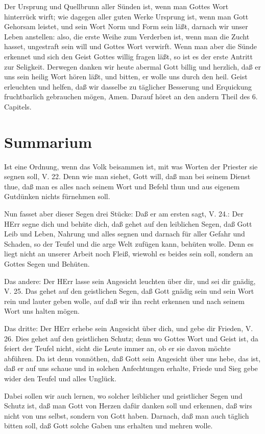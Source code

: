 Der Ursprung und Quellbrunn aller Sünden ist, wenn man Gottes Wort hinterrück wirft; wie dagegen aller guten Werke Ursprung ist, wenn man Gott Gehorsam leistet, und sein Wort Norm und Form sein läßt, darnach wir unser Leben anstellen: also, die erste Weihe zum Verderben ist, wenn man die Zucht hasset, ungestraft sein will und Gottes Wort verwirft. Wenn man aber die Sünde erkennet und sich den Geist Gottes willig fragen läßt, so ist es der erste Antritt zur Seligkeit. Derwegen danken wir heute abermal Gott billig und herzlich, daß er uns sein heilig Wort hören läßt, und bitten, er wolle uns durch den heil. Geist erleuchten und helfen, daß wir dasselbe zu täglicher Besserung und Erquickung fruchtbarlich gebrauchen mögen, Amen. Darauf höret an den andern Theil des 6. Capitels.

\section{Summarium}

Ist eine Ordnung, wenn das Volk beisammen ist, mit was Worten der Priester sie segnen soll, V. 22. Denn wie man siehet, Gott will, daß man bei seinem Dienst thue, daß man es alles nach seinem Wort und Befehl thun und aus eigenem Gutdünken nichts fürnehmen soll.

Nun fasset aber dieser Segen drei Stücke: Daß er am ersten sagt, V. 24.: Der HErr segne dich und behüte dich, daß gehet auf den leiblichen Segen, daß Gott Leib und Leben, Nahrung und alles segnen und darnach für aller Gefahr und Schaden, so der Teufel und die arge Welt zufügen kann, behüten wolle. Denn es liegt nicht an unserer Arbeit noch Fleiß, wiewohl es beides sein soll, sondern an Gottes Segen und Behüten.

Das andere: Der HErr lasse sein Angesicht leuchten über dir, und sei dir gnädig, V. 25. Das gehet auf den geistlichen Segen, daß Gott gnädig sein und sein Wort rein und lauter geben wolle, auf daß wir ihn recht erkennen und nach seinem Wort uns halten mögen.

Das dritte: Der HErr erhebe sein Angesicht über dich, und gebe dir Frieden, V. 26. Dies gehet auf den geistlichen Schutz; denn wo Gottes Wort und Geist ist, da feiert der Teufel nicht, sicht die Leute immer an, ob er sie davon möchte abführen. Da ist denn vonnöthen, daß Gott sein Angesicht über uns hebe, das ist, daß er auf uns schaue und in solchen Anfechtungen erhalte, Friede und Sieg gebe wider den Teufel und alles Unglück.

Dabei sollen wir auch lernen, wo solcher leiblicher und geistlicher Segen und Schutz ist, daß man Gott von Herzen dafür danken soll und erkennen, daß wirs nicht von uns selbst, sondern von Gott haben. Darnach, daß man auch täglich bitten soll, daß Gott solche Gaben uns erhalten und mehren wolle.

